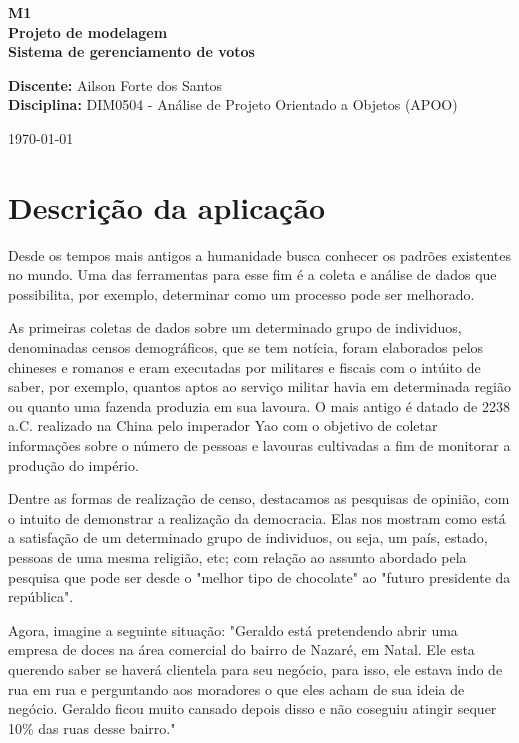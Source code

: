 \documentclass[a4paper,12pt]{article}
\begin{document}
\begin{titlepage}
\begin{center}
\centering
\linespread{2.0}
\Huge\Huge\textbf{M1} \\
\huge\huge\textbf{Projeto de modelagem} \\
\LARGE\LARGE\textbf{Sistema de gerenciamento de votos} \\
\vfill
\end{center}
\textbf{Discente: } Ailson Forte dos Santos \\
\textbf{Disciplina: } DIM0504 - Análise de Projeto Orientado a Objetos (APOO) \\
{\par\hfill\today}
\end{titlepage}
\newpage
\tableofcontents

\newpage
\section*{Descrição da aplicação}
\markright{}
Desde os tempos mais antigos a humanidade busca conhecer os padrões existentes no mundo. Uma das ferramentas para esse fim é a coleta e análise de dados que possibilita, por exemplo, determinar como um processo pode ser melhorado.
\par As primeiras coletas de dados sobre um determinado grupo de individuos, denominadas censos demográficos, que se tem notícia, foram elaborados pelos chineses e romanos e eram executadas por militares e fiscais com o intúito de saber, por exemplo, quantos aptos ao serviço militar havia em determinada região ou quanto uma fazenda produzia em sua lavoura. O mais antigo é datado de 2238 a.C. realizado na China pelo imperador Yao com o objetivo de coletar informações sobre o número de pessoas e lavouras cultivadas a fim de monitorar a produção do império.
\par Dentre as formas de realização de censo, destacamos as pesquisas de opinião, com o intuito de demonstrar a realização da democracia. Elas nos mostram como está a satisfação de um determinado grupo de individuos, ou seja, um país, estado, pessoas de uma mesma religião, etc; com relação ao assunto abordado pela pesquisa que pode ser desde o "melhor tipo de chocolate" ao "futuro presidente da república".
\par Agora, imagine a seguinte situação: "Geraldo está pretendendo abrir uma empresa de doces na área comercial do bairro de Nazaré, em Natal. Ele esta querendo saber se haverá clientela para seu negócio, para isso, ele estava indo de rua em rua e perguntando aos moradores o que eles acham de sua ideia de negócio. Geraldo ficou muito cansado depois disso e não coseguiu atingir sequer 10\% das ruas desse bairro."
\end{document}
